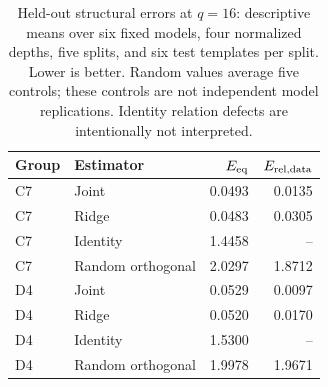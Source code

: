 \begin{table}[t]
\centering
\small
\begin{tabular}{llrr}
\toprule
Group & Estimator & $E_{\rm eq}$ & $E_{\rm rel,data}$ \\
\midrule
C7 & Joint & 0.0493 & 0.0135 \\
C7 & Ridge & 0.0483 & 0.0305 \\
C7 & Identity & 1.4458 & -- \\
C7 & Random orthogonal & 2.0297 & 1.8712 \\
\midrule
D4 & Joint & 0.0529 & 0.0097 \\
D4 & Ridge & 0.0520 & 0.0170 \\
D4 & Identity & 1.5300 & -- \\
D4 & Random orthogonal & 1.9978 & 1.9671 \\
\bottomrule
\end{tabular}
\caption{Held-out structural errors at $q=16$: descriptive means over six fixed models, four normalized depths, five splits, and six test templates per split. Lower is better. Random values average five controls; these controls are not independent model replications. Identity relation defects are intentionally not interpreted.}
\label{tab:structural-main}
\end{table}
